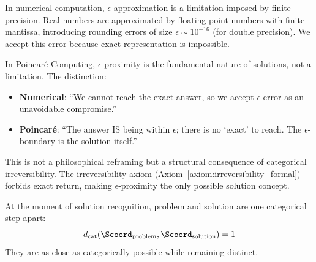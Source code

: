 \begin{remark}
\label{rem:numerical_comparison}
In numerical computation, $\epsilon$-approximation is a limitation imposed by finite precision. Real numbers are approximated by floating-point numbers with finite mantissa, introducing rounding errors of size $\epsilon \sim 10^{-16}$ (for double precision). We accept this error because exact representation is impossible.

In Poincaré Computing, $\epsilon$-proximity is the fundamental nature of solutions, not a limitation. The distinction:
\begin{itemize}
    \item \textbf{Numerical}: ``We cannot reach the exact answer, so we accept $\epsilon$-error as an unavoidable compromise.''
    \item \textbf{Poincaré}: ``The answer IS being within $\epsilon$; there is no `exact' to reach. The $\epsilon$-boundary is the solution itself.''
\end{itemize}

This is not a philosophical reframing but a structural consequence of categorical irreversibility. The irreversibility axiom (Axiom~\ref{axiom:irreversibility_formal}) forbids exact return, making $\epsilon$-proximity the only possible solution concept.
\end{remark}

\begin{theorem}
\label{thm:problem_solution_proximity}
At the moment of solution recognition, problem and solution are one categorical step apart:
\begin{equation}
d_{\text{cat}}(\Scoord_{\text{problem}}, \Scoord_{\text{solution}}) = 1
\end{equation}
They are as close as categorically possible while remaining distinct.
\end{theorem}

